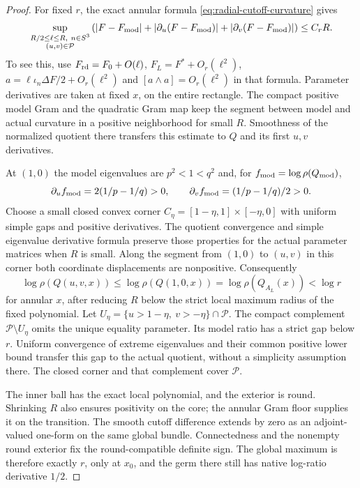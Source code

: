 \documentclass[11pt]{article}
\numberwithin{equation}{section}
\theoremstyle{definition}
\theoremstyle{remark}
\begin{document}
\begin{proof}
For fixed $r$, the exact annular formula
\eqref{eq:radial-cutoff-curvature} gives
\[
 \sup_{\substack{R/2\le\ell\le R,\ n\in S^3\\(u,v)\in\mathcal P}}
 \left(|F-F_{\rm mod}|+
       |\partial_u(F-F_{\rm mod})|+
       |\partial_v(F-F_{\rm mod})|\right)\le C_rR.
\]
To see this, use $F_{\rm rd}=F_0+O(\ell)$,
$F_L=F^*+O_r(\ell^2)$,
$a=\ell\iota_n\Delta F/2+O_r(\ell^2)$ and
$[a\wedge a]=O_r(\ell^2)$ in that formula. Parameter
derivatives are taken at fixed $x$, on the entire rectangle.
The compact positive model Gram and the quadratic Gram map
keep the segment between model and actual curvature in a
positive neighborhood for small $R$. Smoothness of the
normalized quotient there transfers this estimate to $Q$
and its first $u,v$ derivatives.

At $(1,0)$ the model eigenvalues are $p^2<1<q^2$ and,
for $f_{\rm mod}=\log\rho(Q_{\rm mod})$,
\[
 \partial_u f_{\rm mod}=2(1/p-1/q)>0,
 \qquad \partial_v f_{\rm mod}=(1/p-1/q)/2>0.
\]
Choose a small closed convex corner
$C_\eta=[1-\eta,1]\times[-\eta,0]$ with uniform simple
gaps and positive derivatives. The quotient convergence
and simple eigenvalue derivative formula preserve those
properties for the actual parameter matrices when $R$
is small. Along the segment from $(1,0)$ to $(u,v)$ in
this corner both coordinate displacements are nonpositive.
Consequently
\[
 \log\rho(Q(u,v,x))\le\log\rho(Q(1,0,x))
             =\log\rho(Q_{A_L}(x))<\log r
\]
for annular $x$, after reducing $R$ below the strict local
maximum radius of the fixed polynomial. Let
$U_\eta=\{u>1-\eta,\ v>-\eta\}\cap\mathcal P$.
The compact complement $\mathcal P\setminus U_\eta$
omits the unique equality parameter. Its model ratio has
a strict gap below $r$. Uniform convergence of extreme
eigenvalues and their common positive lower bound transfer
this gap to the actual quotient, without a simplicity
assumption there. The closed corner and that complement
cover $\mathcal P$.

The inner ball has the exact local polynomial, and the
exterior is round. Shrinking $R$ also ensures positivity
on the core; the annular Gram floor supplies it on the
transition. The smooth cutoff difference extends by zero
as an adjoint-valued one-form on the same global bundle.
Connectedness and the nonempty round exterior fix the
round-compatible definite sign. The global maximum is
therefore exactly $r$, only at $x_0$, and the germ there
still has native log-ratio derivative $1/2$.


\end{proof}
\end{document}
